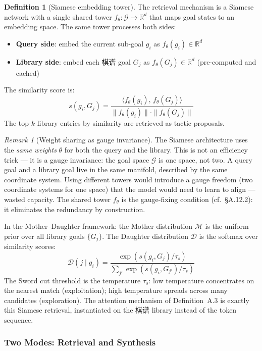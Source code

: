 \documentclass[11pt,a4paper]{article}
\theoremstyle{definition}
\newtheorem{definition}[theorem]{Definition}
\theoremstyle{remark}
\newtheorem{remark}[theorem]{Remark}
\begin{document}
\begin{definition}[Siamese embedding tower]\label{def:siamese}
The retrieval mechanism is a Siamese network with a single shared tower $f_\theta: \mathcal{G} \to \mathbb{R}^d$ that maps goal states to an embedding space. The same tower processes both sides:
\begin{itemize}[nosep]
  \item \textbf{Query side}: embed the current sub-goal $g_i$ as $f_\theta(g_i) \in \mathbb{R}^d$
  \item \textbf{Library side}: embed each 棋谱 goal $G_j$ as $f_\theta(G_j) \in \mathbb{R}^d$ (pre-computed and cached)
\end{itemize}
The similarity score is:
\[
  s(g_i, G_j) = \frac{\langle f_\theta(g_i),\, f_\theta(G_j) \rangle}{\|f_\theta(g_i)\| \cdot \|f_\theta(G_j)\|}
\]
The top-$k$ library entries by similarity are retrieved as tactic proposals.
\end{definition}

\begin{remark}[Weight sharing as gauge invariance]\label{rem:gauge_siamese}
The Siamese architecture uses the \emph{same weights} $\theta$ for both the query and the library. This is not an efficiency trick --- it is a gauge invariance: the goal space $\mathcal{G}$ is one space, not two. A query goal and a library goal live in the same manifold, described by the same coordinate system. Using different towers would introduce a gauge freedom (two coordinate systems for one space) that the model would need to learn to align --- wasted capacity. The shared tower $f_\theta$ is the gauge-fixing condition (cf.\ \S A.12.2): it eliminates the redundancy by construction.

In the Mother--Daughter framework: the Mother distribution $\mathcal{M}$ is the uniform prior over all library goals $\{G_j\}$. The Daughter distribution $\mathcal{D}$ is the softmax over similarity scores:
\[
  \mathcal{D}(j \mid g_i) = \frac{\exp(s(g_i, G_j) / \tau_s)}{\sum_{j'} \exp(s(g_i, G_{j'}) / \tau_s)}
\]
The Sword cut threshold is the temperature $\tau_s$: low temperature concentrates on the nearest match (exploitation); high temperature spreads across many candidates (exploration). The attention mechanism of Definition~A.3 is exactly this Siamese retrieval, instantiated on the 棋谱 library instead of the token sequence.
\end{remark}


\subsubsection*{Two Modes: Retrieval and Synthesis}
\end{document}
